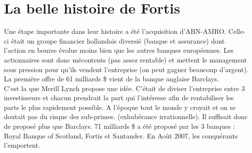 \section{La belle histoire de Fortis}
Une étape importante dans leur histoire a été l'acquisition d'ABN-AMRO. Celle-ci était un groupe financier hollandais diversié (banque et assurance) dont l'action en bourse évolue moins bien que les autres banques européennes. Les actionnaires sont donc mécontents (pas assez rentable) et mettent le management sous pression pour qu'ils vendent l'entreprise (on peut gagner beaucoup d'argent). La première offre de 61 milliards \$ vient de la banque anglaise Barclays. \\
C'est la que Merill Lynch propose une idée. C'était de diviser l'entreprise entre 3 investisseurs et chacun prendrait la part qui l'intéresse afin de rentabiliser les parts le plus rapidement possible. A l'époque tout le monde y croyait et on se doutait pas du risque des sub-primes. (exhubérance irrationnelle). Il suffisait donc de proposé plus que Barclays. 71 milliards \$ a été proposé par les 3 banques : Royal Banque of Scotland, Fortis et Santander. En Août 2007, les conquérants l'emportent. 

